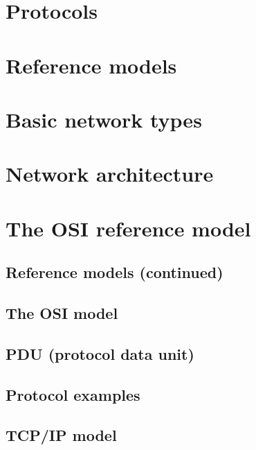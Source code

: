 \documentclass[a4paper, 12pt, titlepage]{report}
\begin{document}
\section{Protocols}
\section{Reference models}
\section{Basic network types}
\section{Network architecture}
\section{The OSI reference model}
\subsection{Reference models (continued)}
\subsection{The OSI model}
\subsection{PDU (protocol data unit)}
\subsection{Protocol examples}
\subsection{TCP/IP model}
\end{document}
